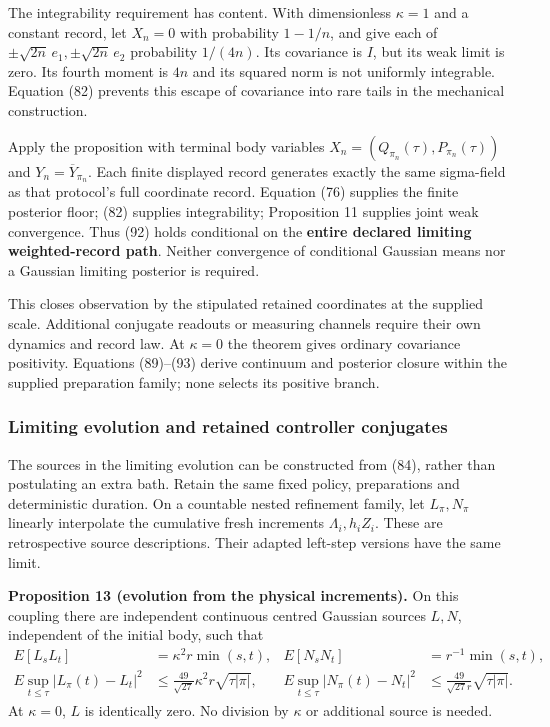\documentclass[11pt,a4paper]{article}
\begin{document}
The integrability requirement has content. With dimensionless
\(\kappa=1\) and a constant record, let \(X_n=0\) with probability
\(1-1/n\), and give each of \(\pm\sqrt{2n}\,e_1, \pm\sqrt{2n}\,e_2\)
probability \(1/(4n)\). Its covariance is \(I\), but its weak limit is
zero. Its fourth moment is \(4n\) and its squared norm is not uniformly
integrable. Equation (82) prevents this escape of covariance into rare
tails in the mechanical construction.

Apply the proposition with terminal body variables
\(X_n=(Q_{\pi_n}(\tau),P_{\pi_n}(\tau))\) and
\(Y_n=\overline Y_{\pi_n}\). Each finite displayed record generates
exactly the same sigma-field as that protocol's full coordinate record.
Equation (76) supplies the finite posterior floor; (82) supplies
integrability; Proposition 11 supplies joint weak convergence. Thus (92)
holds conditional on the \textbf{entire declared limiting
weighted-record path}. Neither convergence of conditional Gaussian means
nor a Gaussian limiting posterior is required.

This closes observation by the stipulated retained coordinates at the
supplied scale. Additional conjugate readouts or measuring channels
require their own dynamics and record law. At \(\kappa=0\) the theorem
gives ordinary covariance positivity. Equations (89)--(93) derive
continuum and posterior closure within the supplied preparation family;
none selects its positive branch.

\hypertarget{limiting-evolution-and-retained-controller-conjugates}{%
\subsubsection{Limiting evolution and retained controller
conjugates}\label{limiting-evolution-and-retained-controller-conjugates}}

The sources in the limiting evolution can be constructed from (84),
rather than postulating an extra bath. Retain the same fixed policy,
preparations and deterministic duration. On a countable nested
refinement family, let \(L_\pi,N_\pi\) linearly interpolate the
cumulative fresh increments \(\Lambda_i,h_iZ_i\). These are
retrospective source descriptions. Their adapted left-step versions have
the same limit.

\textbf{Proposition 13 (evolution from the physical increments).} On
this coupling there are independent continuous centred Gaussian sources
\(L,N\), independent of the initial body, such that \[\begin{aligned}
E[L_sL_t]&=\kappa^2r\min(s,t),&
E[N_sN_t]&=r^{-1}\min(s,t),\\
E\sup_{t\le\tau}|L_\pi(t)-L_t|^2
 &\le\frac{49}{\sqrt{27}}\kappa^2r\sqrt{\tau|\pi|},&
E\sup_{t\le\tau}|N_\pi(t)-N_t|^2
 &\le\frac{49}{\sqrt{27}r}\sqrt{\tau|\pi|}.
\end{aligned}\tag{94}\] At \(\kappa=0\), \(L\) is identically zero. No
division by \(\kappa\) or additional source is needed.
\end{document}

